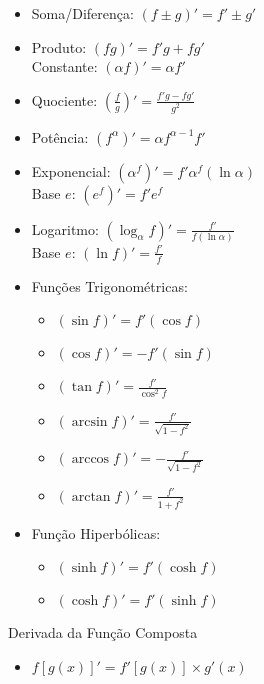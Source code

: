 \documentclass[twocolumn, 11pt]{article}
\begin{document}
\begin{itemize}
    \item Soma/Diferença: $\left(f \pm g\right)' = f' \pm g'$
    \item Produto: $\left(fg\right)' = f'g + fg'$ \\[2pt]
          Constante: $\left(\alpha f\right)' = \alpha f'$
    \item Quociente:
          $\displaystyle \left(\frac{f}{g}\right)' = \frac{f'g - fg'}{g^2}$
    \item Potência: $\displaystyle \left(f^\alpha\right)' = \alpha f^{\alpha - 1}f'$
    \item Exponencial:
          $\displaystyle \left(\alpha^f\right)' = f' \alpha^f (\ln \alpha)$ \\[2pt]
          Base $e$: $\displaystyle \left(e^f\right)' = f' e^f$
    \item Logaritmo:
          $\displaystyle \left(\log_{\alpha} f\right)' = \frac{f'}{f (\ln \alpha)}$ \\[2pt]
          Base $e$: $\displaystyle \left(\ln f\right)' = \frac{f'}{f}$
    \item Funções Trigonométricas:
          \begin{itemize}[label=$\ast$]
              \item $(\sin f)' = f' (\cos f)$
              \item $(\cos f)' = -f' (\sin f)$
              \item $\displaystyle (\tan f)' = \frac{f'}{\cos^2 f}$
              \item $\displaystyle (\arcsin f)' = \frac{f'}{\sqrt{1-f^2}}$
              \item $\displaystyle (\arccos f)' = -\frac{f'}{\sqrt{1-f^2}}$
              \item $\displaystyle (\arctan f)' = \frac{f'}{1 + f^2}$
          \end{itemize}
    \item Função Hiperbólicas:
          \begin{itemize}[label=$\ast$]
              \item $(\sinh f)' = f' (\cosh f)$
              \item $(\cosh f)' = f' (\sinh f)$
          \end{itemize}
\end{itemize}

\vspace{4pt}
Derivada da Função Composta

\begin{itemize}
    \item $f\left[g(x)\right]' = f'\left[g(x)\right] \times g'(x) $
\end{itemize}
\end{document}
